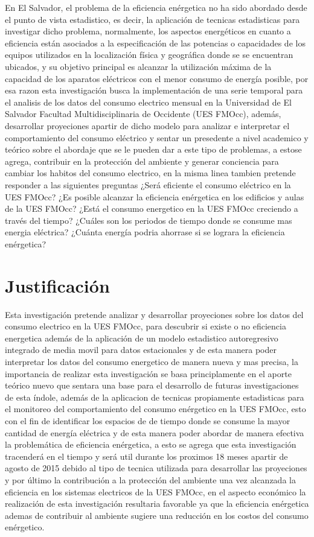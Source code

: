 \documentclass[12pt,letterpaper]{report}
\begin{document}
En El Salvador, el problema de la eficiencia enérgetica no ha sido abordado desde el punto de vista estadistico, es decir, la aplicación de tecnicas estadisticas para investigar dicho problema,
normalmente, los aspectos energéticos en cuanto a eficiencia están asociados a la especificación de
las potencias o capacidades de los equipos utilizados en la localización física y geográfica
donde se se encuentran ubicados, y su objetivo principal es alcanzar la utilización máxima de la
capacidad de los aparatos eléctricos con el menor consumo de energía posible, por esa razon esta investigación busca la implementación de una serie temporal para el analisis de los datos del consumo electrico mensual en la Universidad de El Salvador Facultad Multidisciplinaria de Occidente (UES FMOcc), además, desarrollar proyeciones apartir de dicho modelo para analizar e interpretar el comportamiento del consumo eléctrico y sentar un presedente a nivel academico y teórico sobre el abordaje que se le pueden dar a este tipo de problemas, a estose agrega, contribuir en la protección del ambiente y generar conciencia para cambiar los habitos del consumo electrico, en la misma linea tambien pretende responder a las siguientes preguntas ¿Será eficiente el consumo eléctrico en la UES FMOcc? ¿Es posible alcanzar la eficiencia enérgetica en los edificios y aulas de la UES FMOcc? ¿Está el consumo energetico en la UES FMOcc creciendo a través del tiempo? ¿Cuáles son los periodos de tiempo donde se consume mas energia eléctrica? ¿Cuánta energía podria ahorrase si se lograra la eficiencia enérgetica?

\newpage
\section{Justificación}
Esta investigación pretende analizar y desarrollar proyeciones sobre los datos del consumo electrico en la UES FMOcc, para descubrir si existe o no eficiencia energetica además de la aplicación de un modelo estadistico autoregresivo integrado de media movil para datos estacionales y de esta manera poder interpretar los datos del consumo energetico de manera nueva y mas precisa, la importancia de realizar esta investigación se basa principlamente en el aporte teórico nuevo que sentara una base para el desarrollo de futuras investigaciones de esta índole, además de la aplicacion de tecnicas propiamente estadisticas para el monitoreo del comportamiento del consumo enérgetico en la UES FMOcc, esto con el fin de identificar los espacios de de tiempo donde se consume la mayor cantidad de energía eléctrica y de esta manera poder abordar de manera efectiva la problemática de eficiencia enérgetica, a esto se agrega que esta investigación tracenderá en el tiempo y será util durante los proximos 18 meses apartir de agosto de 2015 debido al tipo de tecnica utilizada para desarrollar las proyeciones y por último la contribución a la protección del ambiente una vez alcanzada la eficiencia en los sistemas electricos de la UES FMOcc, en el aspecto económico la realización de esta investigación resultaria favorable ya que la eficiencia enérgetica ademas de contribuir al ambiente sugiere una reducción en los costos del consumo enérgetico. 
\end{document}

